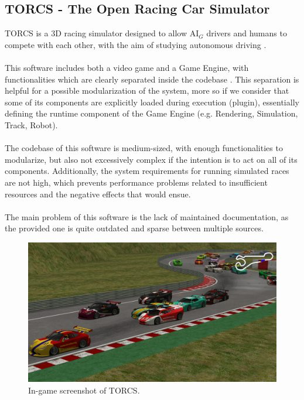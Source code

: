 \subsection{TORCS - The Open Racing Car Simulator}
TORCS is a 3D racing simulator designed to allow AI$_G$ drivers and humans to compete with each other, with the aim of studying autonomous driving \cite{site:torcs-website}. \\ \\
This software includes both a video game and a Game Engine, with functionalities which are clearly separated inside the codebase \cite{site:torcs-source}. This separation is helpful for a possible modularization of the system, more so if we consider that some of its components are explicitly loaded during execution (plugin), essentially defining the runtime component of the Game Engine (e.g. Rendering, Simulation, Track, Robot). \\ \\
The codebase of this software is medium-sized, with enough functionalities to modularize, but also not excessively complex if the intention is to act on all of its components. Additionally, the system requirements for running simulated races are not high, which prevents performance problems related to insufficient resources and the negative effects that would ensue. \\ \\
The main problem of this software is the lack of maintained documentation, as the provided one is quite outdated and sparse between multiple sources.

\begin{figure}
	\centering
	\includegraphics[width=0.8\linewidth]{"immagini/Feasibility study/TORCS"}
	\caption[In-game screenshot of TORCS.]{In-game screenshot of TORCS.}
	\label{fig:torcs}
\end{figure}


